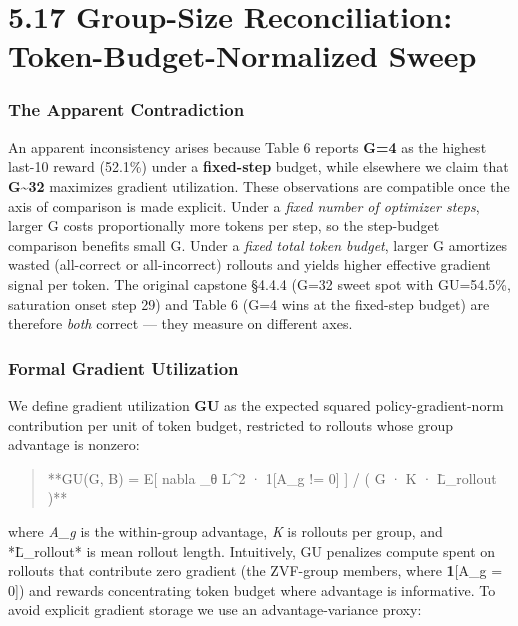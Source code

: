 \documentclass[
  american,
  11pt,
  a4paper,
  oneside]{report}
\begin{document}
\section{5.17 Group-Size Reconciliation: Token-Budget-Normalized
Sweep}\label{group-size-reconciliation-token-budget-normalized-sweep}

\subsubsection{The Apparent
Contradiction}\label{the-apparent-contradiction}

An apparent inconsistency arises because Table 6 reports \textbf{G=4} as
the highest last-10 reward (52.1\%) under a \textbf{fixed-step} budget, while
elsewhere we claim that \textbf{G\textasciitilde32} maximizes gradient
utilization. These observations are compatible once the axis of
comparison is made explicit. Under a \emph{fixed number of optimizer
steps}, larger G costs proportionally more tokens per step, so the
step-budget comparison benefits small G. Under a \emph{fixed total token
budget}, larger G amortizes wasted (all-correct or all-incorrect)
rollouts and yields higher effective gradient signal per token. The
original capstone §4.4.4 (G=32 sweet spot with GU=54.5\%, saturation
onset step 29) and Table 6 (G=4 wins at the fixed-step budget) are
therefore \emph{both} correct --- they measure on different axes.

\subsubsection{Formal Gradient
Utilization}\label{formal-gradient-utilization}

We define gradient utilization \textbf{GU} as the expected squared
policy-gradient-norm contribution per unit of token budget, restricted
to rollouts whose group advantage is nonzero:

\begin{quote}
**GU(G, B) = E{[} \textbar\textbar nabla \_θ L\textbar\textbar\^{}2 ·
1{[}A\_g != 0{]} {]} / ( G · K · L̄\_rollout )**
\end{quote}

where \emph{A\_g} is the within-group advantage, \emph{K} is rollouts
per group, and *L̄\_rollout* is mean rollout length. Intuitively, GU
penalizes compute spent on rollouts that contribute zero gradient (the
ZVF-group members, where \textbf{1}{[}A\_g = 0{]}) and rewards
concentrating token budget where advantage is informative. To avoid
explicit gradient storage we use an advantage-variance proxy:
\end{document}
